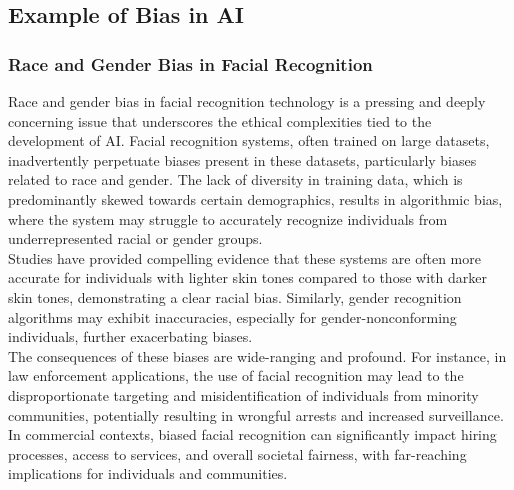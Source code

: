 \documentclass[12pt,a4paper,openright,twoside]{book}
\begin{document}
\subsection{Example of Bias in AI}
\subsubsection{Race and Gender Bias in Facial Recognition} \cite{https://doi.org/10.5281/zenodo.4050457}
Race and gender bias in facial recognition technology is a pressing and deeply concerning issue that underscores the ethical complexities tied to the development of AI. Facial recognition systems, often trained on large datasets, inadvertently perpetuate biases present in these datasets, particularly biases related to race and gender. The lack of diversity in training data, which is predominantly skewed towards certain demographics, results in algorithmic bias, where the system may struggle to accurately recognize individuals from underrepresented racial or gender groups. \\
Studies have provided compelling evidence that these systems are often more accurate for individuals with lighter skin tones compared to those with darker skin tones, demonstrating a clear racial bias. Similarly, gender recognition algorithms may exhibit inaccuracies, especially for gender-nonconforming individuals, further exacerbating biases. \\
The consequences of these biases are wide-ranging and profound. For instance, in law enforcement applications, the use of facial recognition may lead to the disproportionate targeting and misidentification of individuals from minority communities, potentially resulting in wrongful arrests and increased surveillance. In commercial contexts, biased facial recognition can significantly impact hiring processes, access to services, and overall societal fairness, with far-reaching implications for individuals and communities.
\end{document}
